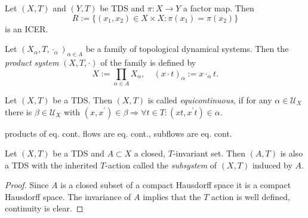 \begin{proposition}
  Let $(X,T)$ and $(Y,T)$ be TDS and $\pi : X \to Y$ a factor map.
  Then 
  \begin{equation*}
    R:= \{ (x_1,x_2)  \in X \times X :  \pi (x_1) = \pi(x_2) \}
  \end{equation*}
  is an ICER.
\end{proposition}

\begin{definition}
  Let $(X_\alpha,T, \cdot_\alpha)_{\alpha \in A}$ be a family of topological dynamical systems.
  Then the \emph{product system} $(X, T, \cdot)$ of the family is defined by
  \begin{equation*}
    X := \prod_{\alpha \in A} X_\alpha, \quad (x\cdot t)_{\alpha} := x \cdot_\alpha t.
  \end{equation*}
\end{definition}

\begin{definition}
  Let $(X,T)$ be a TDS.
  Then $(X,T)$ is called \emph{equicontinuous}, if for any $\alpha \in \mathcal{U}_X$ there is $\beta \in \mathcal{U}_X$ with $(x, x^\prime ) \in \beta \Rightarrow \forall t \in T: (xt,x^\prime t) \in \alpha$.
\end{definition}

\begin{proposition}
  products of eq. cont. flows are eq. cont., subflows are eq. cont.
\end{proposition}

\begin{proposition}[Subsystem]
  Let $(X,T)$ be a TDS and $A \subset X$ a closed, $T$-invariant set.
  Then $(A,T)$ is also a TDS with the inherited $T$-action called the \emph{subsystem} of $(X,T)$ induced by $A$.
\end{proposition}
\begin{proof}
  Since $A$ is a closed subset of a compact Hausdorff space it is a compact Hausdorff space. The invariance of $A$ implies that the $T$ action is well defined, continuity is clear. 
\end{proof}

